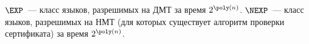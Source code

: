 $\EXP$~--- класс языков, разрешимых на ДМТ за время $2^{\poly(n)}$. $\NEXP$~--- класс языков, разрешимых на НМТ (для которых
существует алгоритм проверки сертификата) за время $2^{\poly(n)}$.
